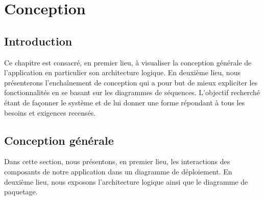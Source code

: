 \chapter{Conception}
\section*{Introduction}
Ce chapitre est consacré, en premier lieu, à visualiser la conception générale de l'application en particulier son architecture logique. En deuxième lieu, nous présenterons l’enchaînement de conception qui a pour but de mieux expliciter les fonctionnalités en se basant sur les diagrammes de séquences. L’objectif recherché étant de façonner le système et de lui donner une forme répondant à tous les besoins et exigences recensés.
\section{Conception générale}
Dans cette section, nous présentons, en premier lieu, les interactions des composants de notre application dans un diagramme de déploiement. En deuxième lieu, nous exposons l'architecture logique ainsi que le diagramme de paquetage. 
